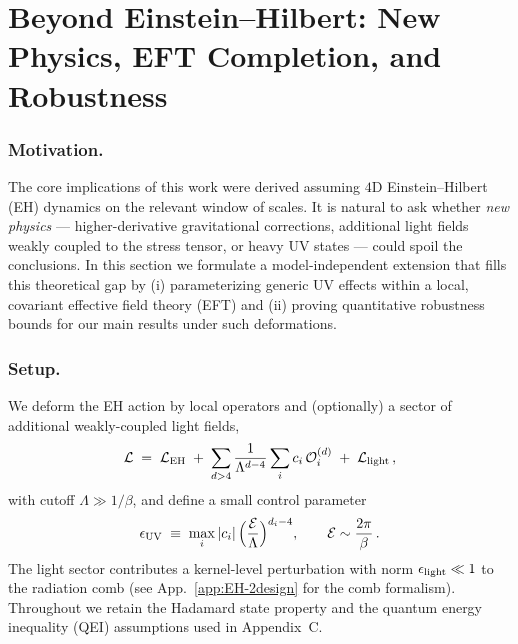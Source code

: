 \documentclass[11pt,a4paper]{article}
\theoremstyle{plain}
\theoremstyle{definition}
\theoremstyle{remark}
\begin{document}
\section{Beyond Einstein--Hilbert: New Physics, EFT Completion, and Robustness}
\label{sec:new-physics}

\subsubsection{Motivation.} The core implications of this work were derived assuming $4$D Einstein--Hilbert (EH) dynamics on the relevant window of scales. It is natural to ask whether \emph{new physics} --- higher-derivative gravitational corrections, additional light fields weakly coupled to the stress tensor, or heavy UV states --- could spoil the conclusions. In this section we formulate a model-independent extension that fills this theoretical gap by (i) parameterizing generic UV effects within a local, covariant effective field theory (EFT) and (ii) proving quantitative robustness bounds for our main results under such deformations.

\subsubsection{Setup.} We deform the EH action by local operators and (optionally) a sector of additional weakly-coupled light fields,
\begin{equation}
\mathcal{L} \;=\; \mathcal{L}_{\rm EH} \;+\; \sum_{d>4} \frac{1}{\Lambda^{d-4}} \sum_i c_i\, \mathcal{O}^{(d)}_i \;+\; \mathcal{L}_{\rm light}\,,
\end{equation}
with cutoff $\Lambda \gg 1/\beta$, and define a small control parameter
\begin{equation}
\epsilon_{\rm UV} \;\equiv\; \max_i |c_i| \,\Big(\frac{\mathcal{E}}{\Lambda}\Big)^{d_i-4}, \qquad \mathcal{E}\sim \frac{2\pi}{\beta}\,.
\end{equation}
The light sector contributes a kernel-level perturbation with norm $\epsilon_{\rm light}\ll 1$ to the radiation comb (see App.~\ref{app:EH-2design} for the comb formalism). Throughout we retain the Hadamard state property and the quantum energy inequality (QEI) assumptions used in Appendix~C.
\end{document}
